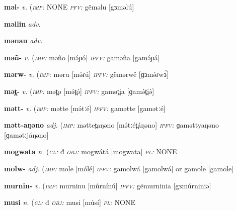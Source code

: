 {\newentry
\headword\textbf{məl-}  
\ipa{[mɘl-]}
\synpos\textit{v.} 
\imperative(\textit {\textsc{imp:}} NONE \imperfective\textit{\textsc{pfv:}} gëməlu [gɜməlú]

\newentry
\headword\textbf{məllin}  
\ipa{[məlːin]}
\synpos\textit{adv.} 

\newentry
\headword\textbf{mənau}  
\ipa{[mənau]}
\synpos\textit{adv.} 

\newentry
\headword\textbf{məñ-}  
\ipa{[mə́ɲ-]}
\synpos\textit{v.} 
\imperative(\textit {\textsc{imp:}} məño [mə́ɲó] \imperfective\textit{\textsc{ipfv:}} gaməña [gamə́ɲá] 

\newentry
\headword\textbf{mərw-}  
\ipa{[mə́ɾw-]}
\synpos\textit{v.} 
\imperative(\textit {\textsc{imp:}} məru [mə́ɾú] \imperfective\textit{\textsc{ipfv:}} gëmərwë [ɡɜmə́ɾwɜ́]

\newentry
\headword\textbf{mət̪-}  
\ipa{[mə́t̪-]}
\synpos\textit{v.} 
\imperative(\textit {\textsc{imp:}} mət̪o [mə́t̪ó] \imperfective\textit{\textsc{ipfv:}} gamət̪ia [ɡamə́t̪iə́]

\newentry
\headword\textbf{mətt-}  
\ipa{[mə́tː-]}
\synpos\textit{v.} 
\imperative(\textit {\textsc{imp:}} mətte [mə́tːé] \imperfective\textit{\textsc{ipfv:}} gamətte [gamətːé]

\newentry
\headword\textbf{mətt-aŋəno}  
\synpos\textit{adj.} 
\imperative(\textit {\textsc{imp:}} məttet̪aŋəno [mə́tːét̪áŋəno] \imperfective\textit{\textsc{ipfv:}} ɡaməttyaŋəno [ɡamətːjáŋəno]

\newentry
\headword\textbf{mogwata} 
\ipa{[mogwátá]}
\synpos\textit{n.} 
\class(\textit{\textsc{cl:}} {đ}
\object\textit{\textsc{obj:}} mogwátá [mogwata]
\plural\textit{\textsc{pl:}} NONE

\newentry
\headword\textbf{molw-}  
\ipa{[molw-]}
\synpos\textit{adj.} 
\imperative(\textit {\textsc{imp:}} mole [mólé] \imperfective\textit{\textsc{ipfv:}} gamolwá [gamolwá] or gamole [gamole] %

\newentry
\headword\textbf{murnin-}  
\ipa{[múrnin-]}
\synpos\textit{v.} 
\imperative(\textit {\textsc{imp:}} murninu [múrnínú] \imperfective\textit{\textsc{ipfv:}} gëmurninia [gɜmúrniniə]

\newentry
\headword\textbf{musi} 
\ipa{[músí]}
\synpos\textit{n.} 
\class(\textit{\textsc{cl:}} {đ}
\object\textit{\textsc{obj:}} musi [músí]
\plural\textit{\textsc{pl:}} NONE

}
